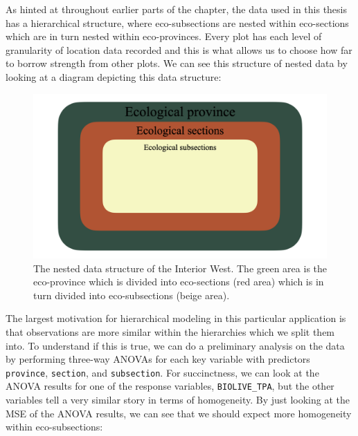 \documentclass[12pt,twoside]{reedthesis}
\begin{document}
As hinted at throughout earlier parts of the chapter, the data used in this thesis has a hierarchical structure, where eco-subsections are nested within eco-sections which are in turn nested within eco-provinces. Every plot has each level of granularity of location data recorded and this is what allows us to choose how far to borrow strength from other plots. We can see this structure of nested data by looking at a diagram depicting this data structure:
\begin{figure}

{\centering \includegraphics[width=1\linewidth]{figure/data-structure} 

}

\caption[The nested data structure of the Interior West]{The nested data structure of the Interior West. The green area is the eco-province which is divided into eco-sections (red area) which is in turn divided into eco-subsections (beige area).}\label{fig:unnamed-chunk-11}
\end{figure}
The largest motivation for hierarchical modeling in this particular application is that observations are more similar within the hierarchies which we split them into. To understand if this is true, we can do a preliminary analysis on the data by performing three-way ANOVAs for each key variable with predictors \texttt{province}, \texttt{section}, and \texttt{subsection}. For succinctness, we can look at the ANOVA results for one of the response variables, \texttt{BIOLIVE\_TPA}, but the other variables tell a very similar story in terms of homogeneity. By just looking at the MSE of the ANOVA results, we can see that we should expect more homogeneity within eco-subsections:
\end{document}
